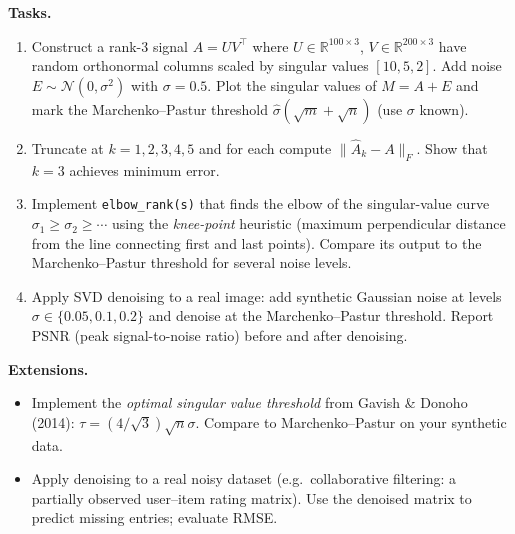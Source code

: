 \documentclass[11pt, a4paper]{article}
\newcommand{\tasks}[1]{%
  \begin{taskbox}
  \textbf{\color{taskcolor}Tasks.}
  \begin{enumerate}[leftmargin=1.6em, itemsep=3pt] #1 \end{enumerate}
  \end{taskbox}
}
\newcommand{\extensions}[1]{%
  \textbf{\color{notecolor}Extensions.}
  \begin{itemize}[leftmargin=1.6em, itemsep=1pt] #1 \end{itemize}
}
\begin{document}
\tasks{
  \item Construct a rank-3 signal $A = UV^\top$ where $U \in \mathbb{R}^{100\times 3}$,
        $V \in \mathbb{R}^{200\times 3}$ have random orthonormal columns scaled by
        singular values $[10, 5, 2]$.  Add noise $E \sim \mathcal{N}(0, \sigma^2)$
        with $\sigma = 0.5$.  Plot the singular values of $M = A + E$ and mark the
        Marchenko--Pastur threshold $\hat\sigma(\sqrt{m}+\sqrt{n})$ (use $\sigma$ known).
  \item Truncate at $k = 1, 2, 3, 4, 5$ and for each compute
        $\|\hat{A}_k - A\|_F$.  Show that $k = 3$ achieves minimum error.
  \item Implement \texttt{elbow\_rank(s)} that finds the elbow of the singular-value
        curve $\sigma_1 \geq \sigma_2 \geq \cdots$ using the \emph{knee-point} heuristic
        (maximum perpendicular distance from the line connecting first and last points).
        Compare its output to the Marchenko--Pastur threshold for several noise levels.
  \item Apply SVD denoising to a real image: add synthetic Gaussian noise at levels
        $\sigma \in \{0.05, 0.1, 0.2\}$ and denoise at the Marchenko--Pastur threshold.
        Report PSNR (peak signal-to-noise ratio) before and after denoising.
}

\extensions{
  \item Implement the \emph{optimal singular value threshold} from
        Gavish \& Donoho (2014): $\tau = (4/\sqrt{3})\sqrt{n}\sigma$.
        Compare to Marchenko--Pastur on your synthetic data.
  \item Apply denoising to a real noisy dataset (e.g.\ collaborative filtering:
        a partially observed user--item rating matrix).
        Use the denoised matrix to predict missing entries; evaluate RMSE.
}

\end{document}
